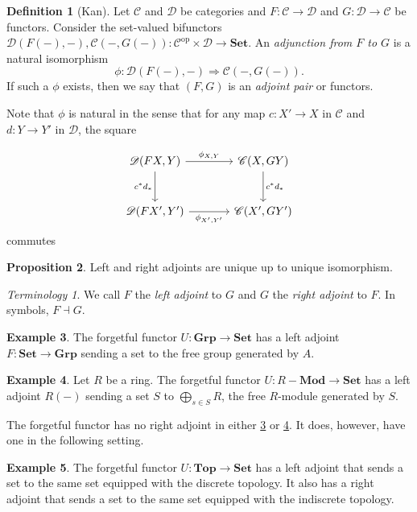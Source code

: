 \documentclass[10pt,letterpaper,cm]{nupset}
\theoremstyle{definition}
\newtheorem{definition}{Definition}[section]
\newtheorem{exmp}[definition]{Example}
\theoremstyle{theorem}
\newtheorem{prop}[definition]{Proposition}
\theoremstyle{remark}
\newtheorem*{term}{Terminology}
\newcommand{\1}{\mathbf{1}}
\renewcommand{\c}{\mathscr{C}}
\renewcommand{\d}{\mathscr{D}}
\newcommand{\0}{\vec 0}
\DeclareMathOperator{\op}{op}
\begin{document}
\begin{definition}[Kan]
Let $\c$ and $\d$ be categories and $F : \c \to \d$ and $G: \d \to \c$ be functors. Consider the set-valued bifunctors $ \d(F(-), -), \c(-, G(-)): \c^{\op} \times \d \to \mathbf{Set}$. An \textit{adjunction from $F$ to $G$} is a natural isomorphism $$\phi : \d(F(-), -) \Rightarrow \c(-, G(-)).$$
If such a $\phi$ exists, then we say that $\left(F, G\right)$ is an \textit{adjoint pair} or functors. 
\end{definition}

\smallskip


Note that $\phi$ is natural in the sense that for any map $c: X' \to X$ in $\c$ and $d: Y \to Y'$ in $\d$, the square

\[
\begin{tikzcd}[row sep=large, column sep = large]
\d(F{X}, Y) \arrow[r, "\phi_{X, Y}"] \arrow[d, "c^{\ast}d_{\ast}", swap]
& \c(X, G{Y}) \arrow[d, "c^{\ast}d_{\ast}"] \\
\d(F{X'}, Y')\arrow[r, "\phi_{X', Y'}"']
& \c(X', G{Y'})  
\end{tikzcd}
\] commutes

\begin{prop}
Left and right adjoints are unique up to unique isomorphism.
\end{prop}

\begin{term}
We call $F$ the \textit{left adjoint} to $G$ and $G$ the \textit{right adjoint} to $F$. In symbols, $F \dashv G$.
\end{term}



\begin{exmp}\label{U1}
The forgetful functor $U: \mathbf{Grp} \to \mathbf{Set}$ has a left adjoint $F: \mathbf{Set} \to \mathbf{Grp}$ sending a set to the free group generated by $A$. 
\end{exmp}

\begin{exmp}\label{U2}
Let $R$ be a ring. The forgetful functor $U: R{-}\mathbf{Mod}\to \mathbf{Set}$ has a left adjoint $R(-)$ sending a set $S$ to $\bigoplus_{s\in S} R$, the free $R$-module generated by $S$.
\end{exmp}


The forgetful functor has no right adjoint in either \cref{U1} or \cref{U2}. It does, however, have one in the following setting.


\begin{exmp}
The forgetful functor $U: \mathbf{Top} \to \mathbf{Set}$ has a left adjoint that sends a set to the same set equipped with the discrete topology.  It also has a right adjoint that sends a set to the same set equipped with the indiscrete topology.
\end{exmp}
\end{document}
